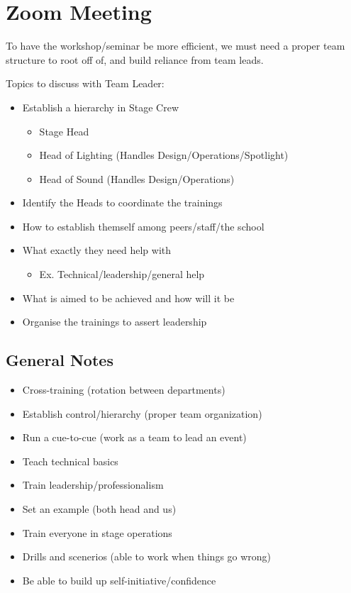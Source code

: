 \section{Zoom Meeting}
\par To have the workshop/seminar be more efficient, we must need a proper team structure 
to root off of, and build reliance from team leads. 
\\
\par \noindent Topics to discuss with Team Leader:
\begin{itemize}
    \item Establish a hierarchy in Stage Crew 
    \begin{itemize}
        \item Stage Head 
        \item Head of Lighting (Handles Design/Operations/Spotlight)
        \item Head of Sound (Handles Design/Operations)
    \end{itemize}
    \item Identify the Heads to coordinate the trainings 
    \item How to establish themself among peers/staff/the school
    \item What exactly they need help with
    \begin{itemize}
        \item Ex. Technical/leadership/general help
    \end{itemize}
    \item What is aimed to be achieved and how will it be 
    \item Organise the trainings to assert leadership
\end{itemize}

\subsection{General Notes}
\begin{itemize}
    \item Cross-training (rotation between departments)
    \item Establish control/hierarchy (proper team organization)
    \item Run a cue-to-cue (work as a team to lead an event)
    \item Teach technical basics 
    \item Train leadership/professionalism
    \item Set an example (both head and us)
    \item Train everyone in stage operations 
    \item Drills and scenerios (able to work when things go wrong)
    \item Be able to build up self-initiative/confidence 
\end{itemize}